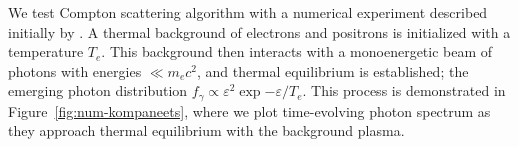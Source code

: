 \begin{figure}[htb]
\end{figure}

We test Compton scattering algorithm with a numerical experiment described initially by \cite{1957JETP....4..730K}. A thermal background of electrons and positrons is initialized with a temperature $T_e$. This background then interacts with a monoenergetic beam of photons with energies $\ll m_e c^2$, and thermal equilibrium is established; the emerging photon distribution $f_\gamma \propto \varepsilon^2\exp{-\varepsilon/T_e}$. This process is demonstrated in Figure~\ref{fig:num-kompaneets}, where we plot time-evolving photon spectrum as they approach thermal equilibrium with the background plasma.

